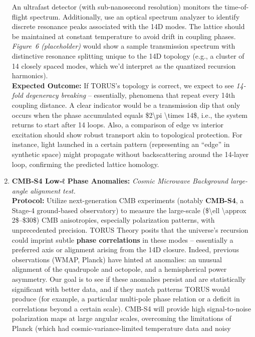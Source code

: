 \documentclass[]{article}
\begin{document}
\begin{enumerate}
  An ultrafast detector (with sub-nanosecond resolution) monitors the
  time-of-flight spectrum. Additionally, use an optical spectrum
  analyzer to identify discrete resonance peaks associated with the 14D
  modes. The lattice should be maintained at constant temperature to
  avoid drift in coupling phases. \emph{Figure~6 (placeholder)} would
  show a sample transmission spectrum with distinctive resonance
  splitting unique to the 14D topology (e.g., a cluster of 14 closely
  spaced modes, which we'd interpret as the quantized recursion
  harmonics).\\
  \textbf{Expected Outcome:} If TORUS's topology is correct, we expect
  to see \emph{14-fold degeneracy breaking} -- essentially, phenomena
  that repeat every 14th coupling distance. A clear indicator would be a
  transmission dip that only occurs when the phase accumulated equals
  \$2\textbackslash{}pi \textbackslash{}times 14\$, i.e., the system
  returns to start after 14 loops. Also, a comparison of edge vs
  interior excitation should show robust transport akin to topological
  protection​. For instance, light launched in a certain pattern
  (representing an ``edge'' in synthetic space) might propagate without
  backscattering around the 14-layer loop, confirming the predicted
  lattice homology.
\item
  \textbf{CMB‑S4 Low‑ℓ Phase Anomalies:} \emph{Cosmic Microwave
  Background large-angle alignment test.}\\
  \textbf{Protocol:} Utilize next-generation CMB experiments (notably
  \textbf{CMB-S4}, a Stage-4 ground-based observatory) to measure the
  large-scale (\$\textbackslash{}ell \textbackslash{}approx 2\$--\$30\$)
  CMB anisotropies, especially polarization patterns, with unprecedented
  precision​. TORUS Theory posits that the universe's recursion could
  imprint subtle \textbf{phase correlations} in these modes --
  essentially a preferred axis or alignment arising from the 14D
  closure. Indeed, previous observations (WMAP, Planck) have hinted at
  anomalies: an unusual alignment of the quadrupole and octopole, and a
  hemispherical power asymmetry​. Our goal is to see if these anomalies
  persist and are statistically significant with better data, and if
  they match patterns TORUS would produce (for example, a particular
  multi-pole phase relation or a deficit in correlations beyond a
  certain scale). CMB-S4 will provide high signal-to-noise polarization
  maps at large angular scales, overcoming the limitations of Planck
  (which had cosmic-variance-limited temperature data and noisy

\end{enumerate}
\end{document}
